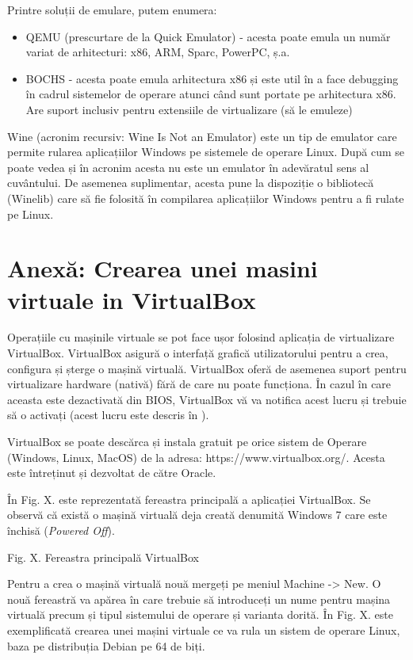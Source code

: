 Printre soluții de emulare, putem enumera:

\begin{itemize}
	\item QEMU (prescurtare de la Quick Emulator) - acesta poate emula un
		număr variat de arhitecturi: x86, ARM, Sparc, PowerPC, ș.a.
	\item BOCHS - acesta poate emula arhitectura x86 și este util în a face
		debugging în cadrul sistemelor de operare atunci când sunt
		portate pe arhitectura x86. Are suport inclusiv pentru
		extensiile de virtualizare (să le emuleze)
\end{itemize}

Wine (acronim recursiv: Wine Is Not an Emulator) este un tip de emulator care
permite rularea aplicațiilor Windows pe sistemele de operare Linux. După cum se
poate vedea și în acronim acesta nu este un emulator în adevăratul sens al
cuvântului. De asemenea suplimentar, acesta pune la dispoziție o bibliotecă
(Winelib) care să fie folosită în compilarea aplicațiilor Windows pentru a fi
rulate pe Linux.

\section{Anexă: Crearea unei masini virtuale in VirtualBox}
\label{sec:vm-virtualbox}

Operațiile cu mașinile virtuale se pot face ușor folosind aplicația de
virtualizare VirtualBox. VirtualBox asigură o interfață grafică utilizatorului
pentru a crea, configura și șterge o mașină virtuală. VirtualBox oferă de
asemenea suport pentru virtualizare hardware (nativă) fără de care nu poate
funcționa. În cazul în care aceasta este dezactivată din BIOS, VirtualBox vă va
notifica acest lucru și trebuie să o activați (acest lucru este descris în
).

VirtualBox se poate descărca și instala gratuit pe orice sistem de Operare
(Windows, Linux, MacOS) de la adresa: https://www.virtualbox.org/. Acesta este
întreținut și dezvoltat de către Oracle.

În Fig. X. este reprezentată fereastra principală a aplicației VirtualBox. Se
observă că există o mașină virtuală deja creată denumită Windows 7 care este
închisă (\textit{Powered Off}).

Fig. X. Fereastra principală VirtualBox

Pentru a crea o mașină virtuală nouă mergeți pe meniul Machine -> New. O nouă
fereastră va apărea în care trebuie să introduceți un nume pentru mașina
virtuală precum și tipul sistemului de operare și varianta dorită. În Fig. X.
este exemplificată crearea unei mașini virtuale ce va rula un sistem de operare
Linux, baza pe distribuția Debian pe 64 de biți.

